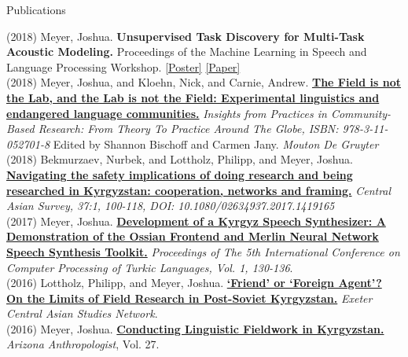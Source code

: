 \documentclass{resume} %
\begin{document}
\begin{minipage}{\textwidth}

  \begin{rSection}{Publications}
    \vspace{.25cm}


      {(2018)} {Meyer, Joshua.} {\bf Unsupervised Task Discovery for Multi-Task Acoustic Modeling.} {Proceedings of the Machine Learning in Speech and Language Processing Workshop.} {\href{https://github.com/JRMeyer/mlslp/blob/master/poster/mlslp-poster.pdf}{[Poster]}} {\href{https://sites.google.com/view/mlslp/proceedings}{[Paper]}} \\  

          {(2018)} {Meyer, Joshua, and Kloehn, Nick, and Carnie, Andrew.} {\href{https://www.degruyter.com/view/product/481684}{\bf{The Field is not the Lab, and the Lab is not the Field: Experimental linguistics and endangered language communities.}}} {{\it Insights from Practices in Community-Based Research: From Theory To Practice Around The Globe, ISBN: 978-3-11-052701-8} Edited by Shannon Bischoff and Carmen Jany. \textit{Mouton De Gruyter}}\\


        {(2018)} {Bekmurzaev, Nurbek, and Lottholz, Philipp, and Meyer, Joshua.} {\href{https://www.tandfonline.com/doi/abs/10.1080/02634937.2017.1419165}{\textbf{Navigating the safety implications of doing research and being researched in Kyrgyzstan: cooperation, networks and framing.}}} {\textit{Central Asian Survey, 37:1, 100-118, DOI: 10.1080/02634937.2017.1419165}}\\
        
        {(2017)} {Meyer, Joshua.} {\href{http://www.turklang.tatar/wp-content/uploads/2017/05/TurkLang-2017.-Tom1.pdf}{{\bf Development of a Kyrgyz Speech Synthesizer: A Demonstration of the Ossian Frontend and Merlin Neural Network Speech Synthesis Toolkit.}}} {\textit{Proceedings of The 5th International Conference on Computer Processing of Turkic Languages, Vol. 1, 130-136}.}\\ 

        {(2016)} {Lottholz, Philipp, and Meyer, Joshua.} { \href{https://blogs.exeter.ac.uk/excas/2016/04/14/friend-or-foreign-agent-on-the-limits-of-field-research-in-post-soviet-kyrgyzstan/}{\bf ‘Friend’ or ‘Foreign Agent’? On the Limits of Field Research in Post-Soviet Kyrgyzstan.}} {\textit{Exeter Central Asian Studies Network}.}\\
 
        {(2016)} {Meyer, Joshua.} { \href{https://journals.uair.arizona.edu/index.php/arizanthro/article/viewFile/21375/20949}{\bf Conducting Linguistic Fieldwork in Kyrgyzstan.}} {\textit{Arizona Anthropologist}, Vol. 27.}   \\  

\end{rSection}

\end{minipage}
\end{document}
